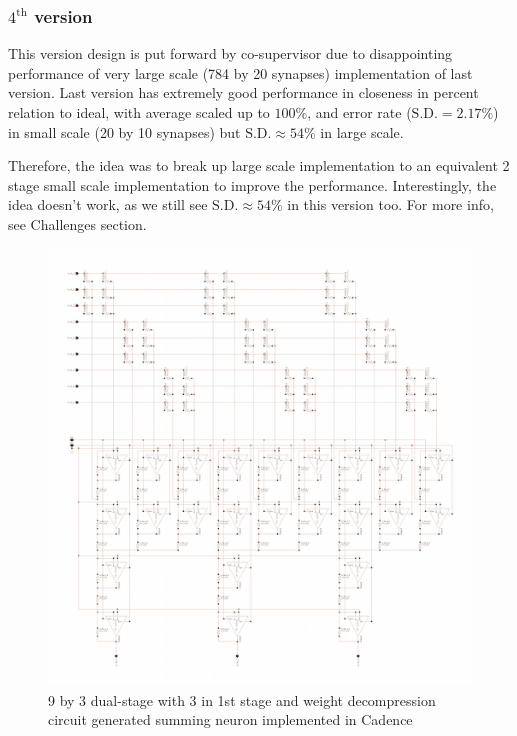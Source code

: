 \subsubsection{$\text{4}^{\text{th}}$ version} %
This version design is put forward by co-supervisor due to disappointing performance of very large scale (784 by 20 synapses) implementation of last version. Last version has extremely good performance in closeness in percent relation to ideal, with average scaled up to $100\%$, and error rate ($\text{S.D.} = 2.17\%$) in small scale (20 by 10 synapses) but $\text{S.D.}\approx 54\%$ in large scale.

Therefore, the idea was to break up large scale implementation to an equivalent 2 stage small scale implementation to improve the performance. Interestingly, the idea doesn't work, as we still see $\text{S.D.}\approx 54\%$ in this version too. For more info, see Challenges section.
\begin{figure}[H]
	\centering
	\includegraphics[scale=0.2]{version4.png}
	\caption{9 by 3 dual-stage with 3 in 1st stage and weight decompression circuit generated summing neuron implemented in Cadence}
\end{figure}